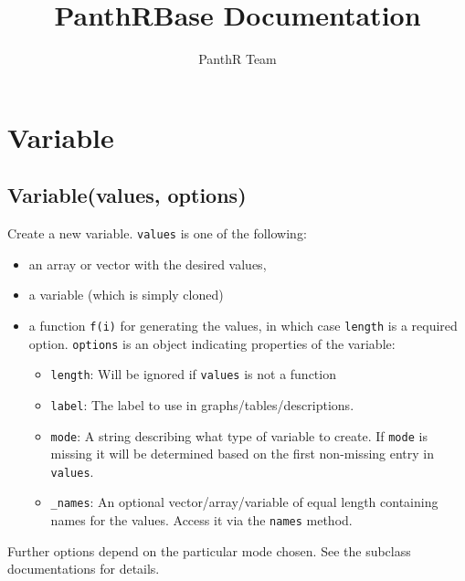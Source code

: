 \documentclass{article}
\title{PanthRBase Documentation}
\author{PanthR Team}
\begin{document}
\maketitle

\tableofcontents

  \section{Variable}
    \subsection*{Variable(values, options)}
    Create a new variable. \texttt{values} is one of the following:


\begin{itemize}

\item an array or vector with the desired values,

\item a variable (which is simply cloned)

\item a function \texttt{f(i)} for generating the values, in which case \texttt{length} is
a required option.
\texttt{options} is an object indicating properties of the variable:\begin{itemize}

\item \texttt{length}: Will be ignored if \texttt{values} is not a function

\item \texttt{label}: The label to use in graphs/tables/descriptions.

\item \texttt{mode}: A string describing what type of variable to create. If \texttt{mode} is missing
it will be determined based on the first non-missing entry in \texttt{values}.

\item \texttt{\_names}: An optional vector/array/variable of equal length containing names for
the values. Access it via the \texttt{names} method.

\end{itemize}



\end{itemize}

Further options depend on the particular mode chosen. See the subclass documentations
for details.
\end{document}
